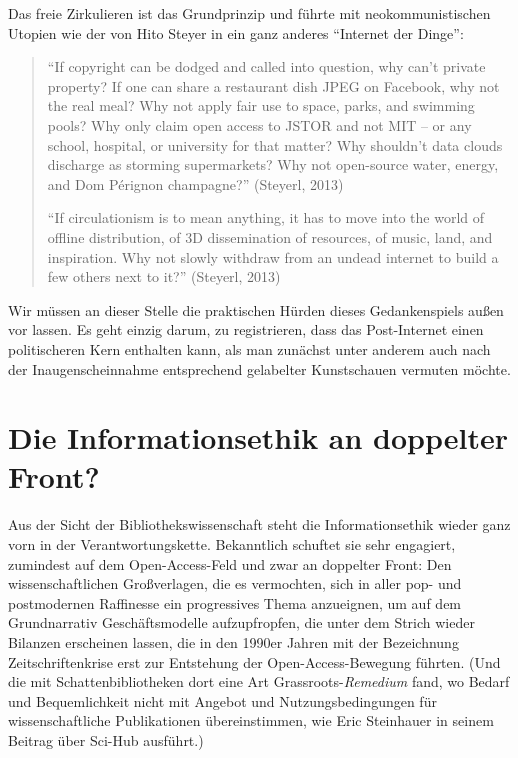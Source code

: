 \documentclass[a4paper,
fontsize=11pt,
oneside,
numbers=noperiodatend,
parskip=half-,
bibliography=totoc,
final
]{scrartcl}
\begin{document}
Das freie Zirkulieren ist das Grundprinzip und führte mit
neokommunistischen Utopien wie der von Hito Steyer in ein ganz anderes
\enquote{Internet der Dinge}:

\begin{quote}
\enquote{If copyright can be dodged and called into question, why can't
private property? If one can share a restaurant dish JPEG on Facebook,
why not the real meal? Why not apply fair use to space, parks, and
swimming pools? Why only claim open access to JSTOR and not MIT -- or
any school, hospital, or university for that matter? Why shouldn't data
clouds discharge as storming supermarkets? Why not open-source water,
energy, and Dom Pérignon champagne?} (Steyerl, 2013)

\enquote{If circulationism is to mean anything, it has to move into the
world of offline distribution, of 3D dissemination of resources, of
music, land, and inspiration. Why not slowly withdraw from an undead
internet to build a few others next to it?} (Steyerl, 2013)
\end{quote}

Wir müssen an dieser Stelle die praktischen Hürden dieses Gedankenspiels
außen vor lassen. Es geht einzig darum, zu registrieren, dass das
Post-Internet einen politischeren Kern enthalten kann, als man zunächst
unter anderem auch nach der Inaugenscheinnahme entsprechend gelabelter
Kunstschauen vermuten möchte.

\section*{Die Informationsethik an doppelter
Front?}\label{die-informationsethik-an-doppelter-front}

Aus der Sicht der Bibliothekswissenschaft steht die Informationsethik
wieder ganz vorn in der Verantwortungskette. Bekanntlich schuftet sie
sehr engagiert, zumindest auf dem Open-Access-Feld und zwar an doppelter
Front: Den wissenschaftlichen Großverlagen, die es vermochten, sich in
aller pop- und postmodernen Raffinesse ein progressives Thema
anzueignen, um auf dem Grundnarrativ Geschäftsmodelle aufzupfropfen, die
unter dem Strich wieder Bilanzen erscheinen lassen, die in den 1990er
Jahren mit der Bezeichnung Zeitschriftenkrise erst zur Entstehung der
Open-Access-Bewegung führten. (Und die mit Schattenbibliotheken dort
eine Art Grassroots-\emph{Remedium} fand, wo Bedarf und Bequemlichkeit
nicht mit Angebot und Nutzungsbedingungen für wissenschaftliche
Publikationen übereinstimmen, wie Eric Steinhauer in seinem Beitrag über
Sci-Hub ausführt.)
\end{document}
